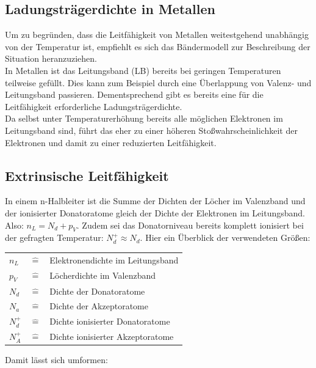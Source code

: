 \subsection{Ladungsträgerdichte in Metallen}
Um zu begründen, dass die Leitfähigkeit von Metallen weitestgehend unabhängig von der Temperatur ist, empfiehlt es sich das Bändermodell zur Beschreibung der Situation heranzuziehen. \\
In Metallen ist das Leitungsband (LB) bereits bei geringen Temperaturen teilweise gefüllt. Dies kann zum Beispiel durch eine Überlappung von Valenz- und Leitungsband passieren. Dementsprechend gibt es bereits eine für die Leitfähigkeit erforderliche Ladungsträgerdichte. \\
Da selbst unter Temperaturerhöhung bereits alle möglichen Elektronen im Leitungsband sind, führt das eher zu einer höheren Stoßwahrscheinlichkeit der Elektronen und damit zu einer reduzierten Leitfähigkeit.

\subsection{Extrinsische Leitfähigkeit}
In einem n-Halbleiter ist die Summe der Dichten der Löcher im Valenzband und der ionisierter Donatoratome gleich der Dichte der Elektronen im Leitungsband. Also: \(n_L = N_d + p_V\). Zudem sei das Donatorniveau bereits komplett ionisiert bei der gefragten Temperatur: \(N_d^+ \approx N_d\). Hier ein Überblick der verwendeten Größen:
\begin{table}[H]
\centering
\begin{tabular}{lcl}
\(n_L\) & \(\widehat{=}\) & Elektronendichte im Leitungsband\\
\(p_V\) & \(\widehat{=}\) & Löcherdichte im Valenzband\\
\(N_d\) & \(\widehat{=}\) & Dichte der Donatoratome\\
\(N_a\) & \(\widehat{=}\) & Dichte der Akzeptoratome\\
\(N_d^+\) & \(\widehat{=}\) & Dichte ionisierter Donatoratome\\
\(N_A^+\) & \(\widehat{=}\) & Dichte ionisierter Akzeptoratome\\
\end{tabular}
\end{table}

Damit lässt sich umformen:

